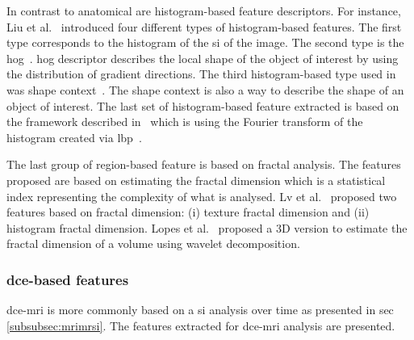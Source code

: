 \begin{enumerate}[leftmargin=*]
  In contrast to anatomical are histogram-based feature descriptors. For instance, Liu et al.~\cite{Liu2013} introduced four different types of histogram-based features. The first type corresponds to the histogram of the \ac{si} of the image. The second type is the \acf{hog}~\cite{Dalal2005}. \Ac{hog} descriptor describes the local shape of the object of interest by using the distribution of gradient directions. The third histogram-based type used in~\cite{Liu2013} was shape context~\cite{Belongie2002}. The shape context is also a way to describe the shape of an object of interest. The last set of histogram-based feature extracted is based on the framework described in~\cite{Zhao2012} which is using the Fourier transform of the histogram created via \acf{lbp}~\cite{Ojala1996}.

  The last group of region-based feature is based on fractal analysis. The features proposed are based on estimating the fractal dimension which is a statistical index representing the complexity of what is analysed. Lv et al.~\cite{Lv2009} proposed two features based on fractal dimension: (i) texture fractal dimension and (ii) histogram fractal dimension. Lopes et al.~\cite{Lopes2011} proposed a 3D version to estimate the fractal dimension of a volume using wavelet decomposition.
\end{enumerate}

\subsubsection{\ac{dce}-based features}\label{subsubsec:fddce}

\ac{dce}-\ac{mri} is more commonly based on a \ac{si} analysis over time as presented in \ac{sec}\,\ref{subsubsec:mrimrsi}. The features extracted for \ac{dce}-\ac{mri} analysis are presented.

